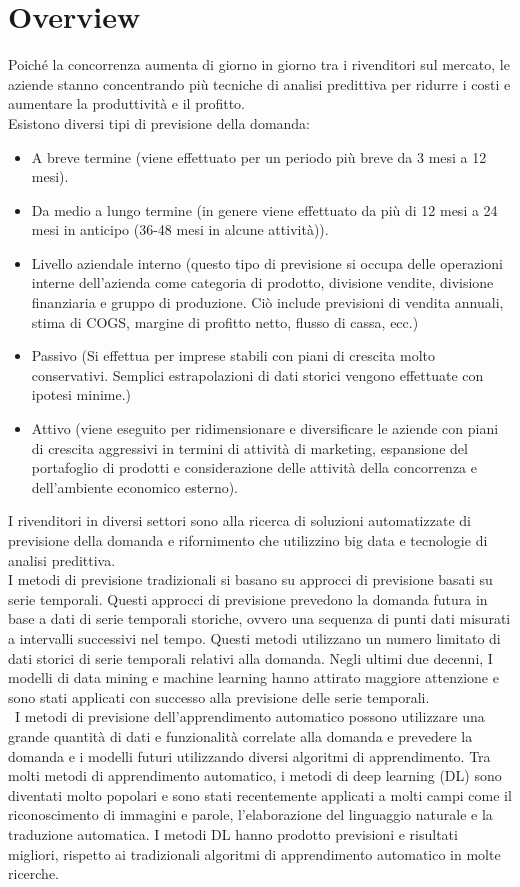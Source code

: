 \documentclass[12pt,a4paper]{report}
\begin{document}
\section{Overview}
Poiché la concorrenza aumenta di giorno in giorno tra i rivenditori sul mercato, le aziende stanno concentrando più tecniche di analisi predittiva per ridurre i costi e aumentare la produttività e il profitto.\\
Esistono diversi tipi di previsione della domanda:
\begin{itemize}
    \item A breve termine (viene effettuato per un periodo più breve da 3 mesi a 12 mesi). 
    \item Da medio a lungo termine (in genere viene effettuato da più di 12 mesi a 24 mesi in anticipo (36-48 mesi in alcune attività)).
    \item Livello aziendale interno (questo tipo di previsione si occupa delle operazioni interne dell'azienda come categoria di prodotto, divisione vendite, divisione finanziaria e gruppo di produzione. Ciò include previsioni di vendita annuali, stima di COGS, margine di profitto netto, flusso di cassa, ecc.)
    \item Passivo (Si effettua per imprese stabili con piani di crescita molto conservativi. Semplici estrapolazioni di dati storici vengono effettuate con ipotesi minime.)
    \item Attivo (viene eseguito per ridimensionare e diversificare le aziende con piani di crescita aggressivi in termini di attività di marketing, espansione del portafoglio di prodotti e considerazione delle attività della concorrenza e dell'ambiente economico esterno).
\end{itemize}

I rivenditori in diversi settori sono alla ricerca di soluzioni automatizzate di previsione della domanda e rifornimento che utilizzino big data e tecnologie di analisi predittiva. \\
I metodi di previsione tradizionali si basano su approcci di previsione basati su serie temporali. Questi approcci di previsione prevedono la domanda futura in base a dati di serie temporali storiche, ovvero una sequenza di punti dati misurati a intervalli successivi nel tempo. Questi metodi utilizzano un numero limitato di dati storici di serie temporali relativi alla domanda. Negli ultimi due decenni, I modelli di data mining e machine learning hanno attirato maggiore attenzione e sono stati applicati con successo alla previsione delle serie temporali.\\\
I metodi di previsione dell'apprendimento automatico possono utilizzare una grande quantità di dati e funzionalità correlate alla domanda e prevedere la domanda e i modelli futuri utilizzando diversi algoritmi di apprendimento. Tra molti metodi di apprendimento automatico, i metodi di deep learning (DL) sono diventati molto popolari e sono stati recentemente applicati a molti campi come il riconoscimento di immagini e parole, l'elaborazione del linguaggio naturale e la traduzione automatica.
I metodi DL hanno prodotto previsioni e risultati migliori, rispetto ai tradizionali algoritmi di apprendimento automatico in molte ricerche. 
\end{document}
